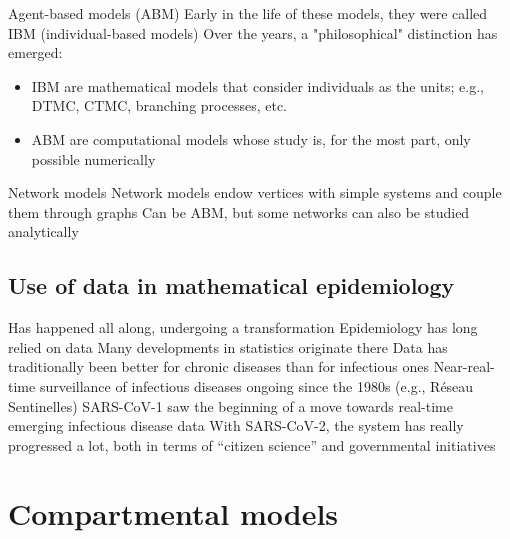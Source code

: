 \documentclass[aspectratio=169]{beamer}\usepackage[]{graphicx}\usepackage[]{xcolor}
\begin{document}
\begin{frame}{Agent-based models (ABM)}
\bbullet Early in the life of these models, they were called IBM (individual-based models)
\vfill
\bbullet Over the years, a "philosophical" distinction has emerged:
\begin{itemize}
\item IBM are mathematical models that consider individuals as the units; e.g., DTMC, CTMC, branching processes, etc.
\item ABM are computational models whose study is, for the most part, only possible numerically
\end{itemize}
\end{frame}

\begin{frame}{Network models}
\bbullet Network models endow vertices with simple systems and couple them through graphs
\vfill
\bbullet Can be ABM, but some networks can also be studied analytically
\end{frame}

\subsection{Use of data in mathematical epidemiology}


\begin{frame}{Has happened all along, undergoing a transformation}
\bbullet Epidemiology has long relied on data
\vfill
\bbullet Many developments in statistics originate there
\vfill
\bbullet Data has traditionally been better for chronic diseases than for infectious ones
\vfill
\bbullet Near-real-time surveillance of infectious diseases ongoing since the 1980s (e.g., Réseau Sentinelles)
\vfill
\bbullet SARS-CoV-1 saw the beginning of a move towards real-time emerging infectious disease data
\vfill
\bbullet With SARS-CoV-2, the system has really progressed a lot, both in terms of ``citizen science'' and governmental initiatives
\end{frame}



\section{Compartmental models}
\end{document}
